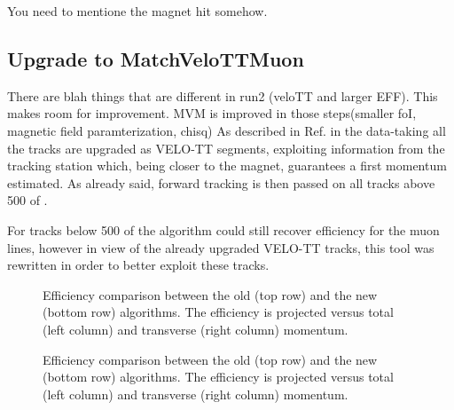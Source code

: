You need to mentione the magnet hit somehow.
\subsection{Upgrade to MatchVeloTTMuon }
\label{sec:matchvelottmuon}
There are blah things that are different in run2 (veloTT and larger EFF). This makes room for improvement.
MVM is improved in those steps(smaller foI, magnetic field paramterization, chisq)
As described in Ref.\cite{LHCb-PUB-2015-005} in the \runtwo data-taking all the tracks are upgraded as VELO-TT segments,
exploiting information from the \ttracker tracking station which, being closer to the magnet,
guarantees a first momentum estimated. As already said, forward tracking is then passed on
all tracks above 500 \mevc of \pt.

For tracks below 500 \mevc of \pt the \mvm algorithm could still recover efficiency for the muon lines,
however in view of the already upgraded VELO-TT tracks, this tool was rewritten in order to better exploit these tracks.


\begin{figure}[h]
  \centering
  \begin{subfigure}{0.5\textwidth}
    \scalebox{.6}{}
    \caption{}
    \label{mvTTm_eff_p}
  \end{subfigure}%
  \hfill%
  \begin{subfigure}{0.5\textwidth}
    \scalebox{.6}{}
    \caption{}
    \label{mvm_eff_p}
  \end{subfigure}
  \caption{Efficiency comparison between the old \mvm (top row) and the new \mvTTm (bottom row) algorithms.
 The efficiency is projected versus total (left column) and transverse (right column) momentum.  }
 \label{mvm_eff_p_comp}
\end{figure}

\begin{figure}[h]
  \centering
  \begin{subfigure}{0.5\textwidth}
    \scalebox{.6}{}
    \caption{}
    \label{mvTTm_eff_p}
  \end{subfigure}%
  \hfill%
  \begin{subfigure}{0.5\textwidth}
    \scalebox{.6}{}
    \caption{}
    \label{mvm_eff_p}
  \end{subfigure}
  \caption{Efficiency comparison between the old \mvm (top row) and the new \mvTTm (bottom row) algorithms.
 The efficiency is projected versus total (left column) and transverse (right column) momentum.  }
 \label{mvm_eff_p_comp}
\end{figure}

